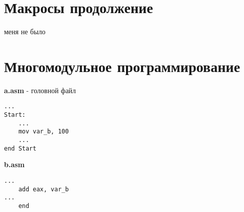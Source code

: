 \documentclass[a4paper, 12pt]{article}
\begin{document}
\newpage
\section*{Макросы продолжение}
\hypertarget{makros2}{}
меня не было


\newpage
\section*{Многомодульное программирование}
\hypertarget{module-programming}{}
    \textbf{a.asm} - головной файл
    \begin{lstlisting}
...
Start:
    ...
    mov var_b, 100
    ...
end Start
    \end{lstlisting}
    
    \textbf{b.asm}
    \begin{lstlisting}
...
    add eax, var_b
...
    end
    \end{lstlisting}
\end{document}
